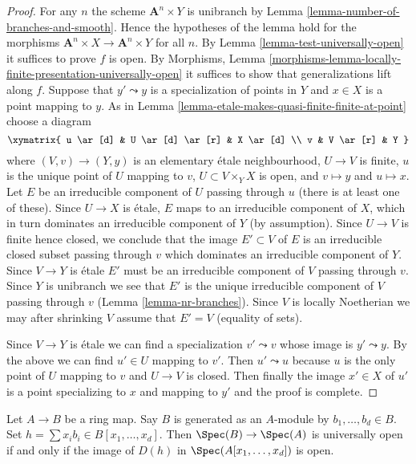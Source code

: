 \begin{proof}
For any $n$ the scheme $\mathbf{A}^n \times Y$ is unibranch
by Lemma \ref{lemma-number-of-branches-and-smooth}. Hence
the hypotheses of the lemma hold for the morphisms
$\mathbf{A}^n \times X \to \mathbf{A}^n \times Y$ for all $n$.
By Lemma \ref{lemma-test-universally-open}
it suffices to prove $f$ is open. By Morphisms, Lemma
\ref{morphisms-lemma-locally-finite-presentation-universally-open}
it suffices to show that generalizations lift along $f$.
Suppose that $y' \leadsto y$ is a specialization of points in
$Y$ and $x \in X$ is a point mapping to $y$.
As in Lemma \ref{lemma-etale-makes-quasi-finite-finite-at-point}
choose a diagram
$$
\xymatrix{
u \ar[d] & U \ar[d] \ar[r] & X \ar[d] \\
v & V \ar[r] & Y
}
$$
where $(V, v) \to (Y, y)$ is an elementary \'etale neighbourhood,
$U \to V$ is finite, $u$ is the unique point of $U$ mapping to $v$,
$U \subset V \times_Y X$ is open, and $v \mapsto y$ and $u \mapsto x$.
Let $E$ be an irreducible component of $U$ passing through $u$
(there is at least one of these). Since $U \to X$ is \'etale, $E$
maps to an irreducible component of $X$,
which in turn dominates an irreducible component of $Y$ (by assumption).
Since $U \to V$ is finite hence closed, we conclude that
the image $E' \subset V$ of $E$ is an irreducible closed subset
passing through $v$ which dominates an irreducible component of $Y$.
Since $V \to Y$ is \'etale $E'$ must be an irreducible component
of $V$ passing through $v$.
Since $Y$ is unibranch we see that $E'$ is the unique irreducible
component of $V$ passing through $v$ (Lemma \ref{lemma-nr-branches}).
Since $V$ is locally Noetherian we may after shrinking $V$
assume that $E' = V$ (equality of sets).

\medskip\noindent
Since $V \to Y$ is \'etale we can find a specialization
$v' \leadsto v$ whose image is $y' \leadsto y$.
By the above we can find $u' \in U$ mapping to $v'$.
Then $u' \leadsto u$ because $u$ is the only point of
$U$ mapping to $v$ and $U \to V$ is closed.
Then finally the image $x' \in X$ of $u'$ is a point
specializing to $x$ and mapping to $y'$ and the proof is complete.
\end{proof}

\begin{lemma}
\label{lemma-characterize-universally-open-finite}
Let $A \to B$ be a ring map. Say $B$ is generated as an $A$-module by
$b_1, \ldots, b_d \in B$. Set $h = \sum x_ib_i \in B[x_1, \ldots, x_d]$.
Then $\Spec(B) \to \Spec(A)$ is universally open if and only if the image of
$D(h)$ in $\Spec(A[x_1, \ldots, x_d])$ is open.
\end{lemma}

